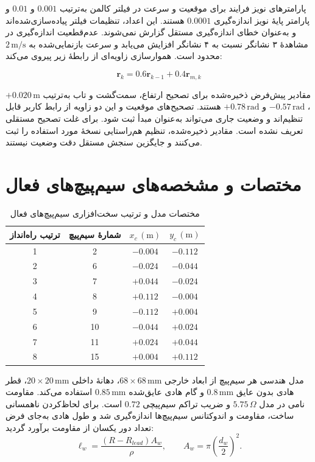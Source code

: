 پارامترهای نویز فرایند برای موقعیت و سرعت در فیلتر کالمن به‌ترتیب $0.001$ و $0.01$ و پارامتر پایهٔ نویز اندازه‌گیری $0.0001$ هستند. این اعداد، تنظیمات فیلتر پیاده‌سازی‌شده‌اند و به‌عنوان خطای اندازه‌گیری مستقل گزارش نمی‌شوند. عدم‌قطعیت اندازه‌گیری در مشاهدهٔ ۳ نشانگر نسبت به ۴ نشانگر افزایش می‌یابد و سرعت بازنمایی‌شده به $2\,\mathrm{m/s}$ محدود است. هموارسازی زاویه‌ای از رابطهٔ زیر پیروی می‌کند:

\begin{equation}
	\mathbf r_k=0.6\mathbf r_{k-1}+0.4\mathbf r_{m,k}
	\label{eq:method-orientation-filter}
\end{equation}


مقادیر پیش‌فرض ذخیره‌شده برای تصحیح ارتفاع، سمت‌گشت و تاب به‌ترتیب $+0.020\,\mathrm m$، $-0.57\,\mathrm{rad}$ و $+0.78\,\mathrm{rad}$ هستند. تصحیح‌های موقعیت و این دو زاویه از رابط کاربر قابل تنظیم‌اند و وضعیت جاری می‌تواند به‌عنوان مبدأ ثبت شود. برای غلت تصحیح مستقلی تعریف نشده است. مقادیر ذخیره‌شده، تنظیم هم‌راستایی نسخهٔ مورد استفاده را ثبت می‌کنند و جایگزین سنجش مستقل دقت وضعیت نیستند.

\section{مختصات و مشخصه‌های سیم‌پیچ‌های فعال}
\label{sec:appendix-coil-parameters}

\begin{table}[!htbp]
	\centering
	\caption{مختصات مدل و ترتیب سخت‌افزاری سیم‌پیچ‌های فعال}
	\label{tab:method-active-coordinates}
	\begin{tabular}{|c|c|c|c|}
		\hline
		\textbf{ترتیب راه‌انداز} & \textbf{شمارهٔ سیم‌پیچ} & $x_c\,(\mathrm m)$ & $y_c\,(\mathrm m)$\\ \hline
		1&2&$-0.004$&$-0.112$\\ \hline
		2&6&$-0.024$&$-0.044$\\ \hline
		3&7&$+0.044$&$-0.024$\\ \hline
		4&8&$+0.112$&$-0.004$\\ \hline
		5&9&$-0.112$&$+0.004$\\ \hline
		6&10&$-0.044$&$+0.024$\\ \hline
		7&11&$+0.024$&$+0.044$\\ \hline
		8&15&$+0.004$&$+0.112$\\ \hline
	\end{tabular}
\end{table}

مدل هندسی هر سیم‌پیچ از ابعاد خارجی $68\times68\,\mathrm{mm}$، دهانهٔ داخلی $20\times20\,\mathrm{mm}$، قطر هادی بدون عایق $0.8\,\mathrm{mm}$ و گام هادی عایق‌شده $0.85\,\mathrm{mm}$ استفاده می‌کند. مقاومت نامی در مدل $5.75\,\Omega$ و ضریب تراکم سیم‌پیچی $0.72$ است. برای لحاظ‌کردن ناهمسانی ساخت، مقاومت و اندوکتانس سیم‌پیچ‌ها اندازه‌گیری شد و طول هادی به‌جای فرض تعداد دور یکسان از مقاومت برآورد گردید:
\begin{equation}
	\ell_w=\frac{(R-R_{lead})A_w}{\rho},
	\qquad A_w=\pi\left(\frac{d_w}{2}\right)^2.
	\label{eq:method-wire-length}
\end{equation}

